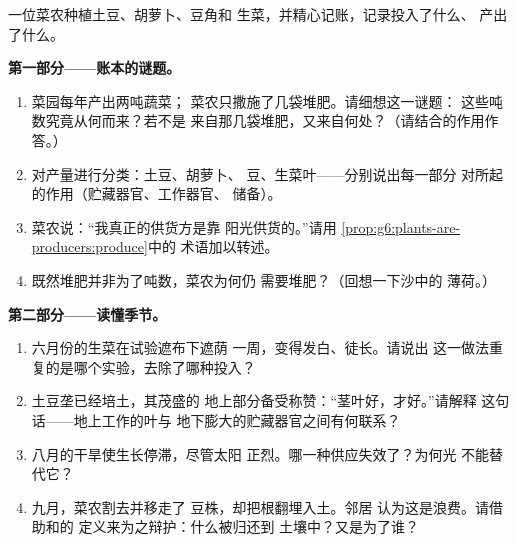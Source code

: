 \begin{problem}\label{pb:g6:plants-are-producers:1}
一位菜农种植土豆、胡萝卜、豆角和
生菜，并精心记账，记录投入了什么、
产出了什么。

\medskip\noindent\textbf{第一部分——账本的谜题。}
\begin{enumerate}
  \item 菜园每年产出两吨蔬菜；
        菜农只撒施了几袋堆肥。请细想这一谜题：
        这些吨数究竟从何而来？若不是
        来自那几袋堆肥，又来自何处？（请结合的作用作答。）
  \item 对产量进行分类：土豆、胡萝卜、
        豆、生菜叶——分别说出每一部分
        对所起的作用（贮藏器官、工作器官、
        储备）。
  \item 菜农说：“我真正的供货方是靠
        阳光供货的。”请用
        \cref{prop:g6:plants-are-producers:produce}中的
        术语加以转述。
  \item 既然堆肥并非为了吨数，菜农为何仍
        需要堆肥？（回想一下沙中的
        薄荷。）
\end{enumerate}

\medskip\noindent\textbf{第二部分——读懂季节。}
\begin{enumerate}[resume]
  \item 六月份的生菜在试验遮布下遮荫
        一周，变得发白、徒长。请说出
        这一做法重复的是哪个实验，去除了哪种投入？
  \item 土豆垄已经培土，其茂盛的
        地上部分备受称赞：“茎叶好，才好。”请解释
        这句话——地上工作的叶与
        地下膨大的贮藏器官之间有何联系？
  \item 八月的干旱使生长停滞，尽管太阳
        正烈。哪一种供应失效了？为何光
        不能替代它？
  \item 九月，菜农割去并移走了
        豆株，却把根翻埋入土。邻居
        认为这是浪费。请借助和的
        定义来为之辩护：什么被归还到
        土壤中？又是为了谁？
\end{enumerate}


\end{problem}
